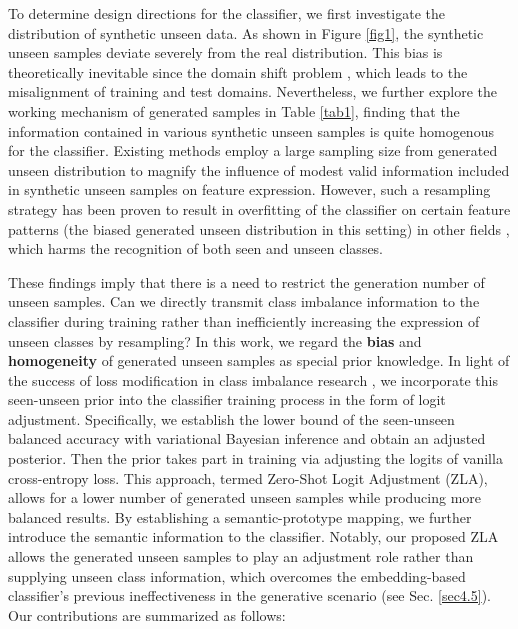 \documentclass{article}
\begin{document}
	To determine design directions for the classifier, we first investigate the distribution of synthetic unseen data. As shown in Figure \ref{fig1}, the synthetic unseen samples deviate severely from the real distribution. This bias is theoretically inevitable since the domain shift problem \cite{fu2014transductive}, which leads to the misalignment of training and test domains. Nevertheless, we further explore the working mechanism of generated samples in Table \ref{tab1}, finding that the information contained in various synthetic unseen samples is quite homogenous for the classifier. Existing methods employ a large sampling size from generated unseen distribution to magnify the influence of modest valid information included in synthetic unseen samples on feature expression. However, such a resampling strategy has been proven to result in overfitting of the classifier on certain feature patterns (the biased generated unseen distribution in this setting) in other fields \cite{buda2018systematic,menon2020long}, which harms the recognition of both seen and unseen classes.
	
	These findings imply that there is a need to restrict the generation number of unseen samples. Can we directly transmit class imbalance information to the classifier during training rather than inefficiently increasing the expression of unseen classes by resampling? In this work, we regard the \textbf{bias} and \textbf{homogeneity} of generated unseen samples as special prior knowledge. In light of the success of loss modification in class imbalance research \cite{lin2017focal,menon2020long}, we incorporate this seen-unseen prior into the classifier training process in the form of logit adjustment. Specifically, we establish the lower bound of the seen-unseen balanced accuracy \cite{xian2017zero} with variational Bayesian inference and obtain an adjusted posterior. Then the prior takes part in training via adjusting the logits of vanilla cross-entropy loss. This approach, termed Zero-Shot Logit Adjustment (ZLA), allows for a lower number of generated unseen samples while producing more balanced results. By establishing a semantic-prototype mapping, we further introduce the semantic information to the classifier. Notably, our proposed ZLA allows the generated unseen samples to play an adjustment role rather than supplying unseen class information, which overcomes the embedding-based classifier's previous ineffectiveness in the generative scenario (see Sec. \ref{sec4.5}). Our contributions are summarized as follows:
	
\end{document}
